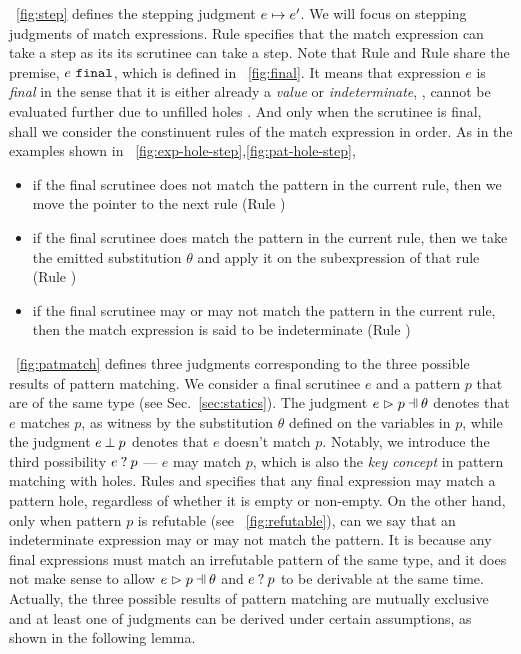 \documentclass[runningheads,envcountsame,a4paper]{llncs}
\begin{document}


\figurename~\ref{fig:step} defines the stepping judgment
$e \mapsto e'$. We will focus on stepping judgments of match expressions.
Rule \ITExpMatch specifies that the match expression can take a step as its its
scrutinee can take a step. Note that Rule \ITFailMatch and Rule \ITSuccMatch
share the premise, $e ~\mathtt{final}$, which is defined in \figurename~\ref{fig:final}. It
means that expression $e$ is \textit{final} in the sense that it is either already a
\textit{value} or \textit{indeterminate}, \ie, cannot be evaluated further due to unfilled holes
\cite{DBLP:journals/pacmpl/OmarVCH19}. And only when the scrutinee is final,
shall we consider the constinuent rules of the match expression in order. As in
the examples shown in \listfigurename~\ref{fig:exp-hole-step},\ref{fig:pat-hole-step},

\begin{itemize}
  \item
    if the final scrutinee does not match the pattern in the current rule,
    then we move the pointer to the next rule (Rule \ITFailMatch)

  \item
    if the final scrutinee does match the pattern in the current rule, 
    then we take the emitted substitution $\theta$ and apply it on the subexpression of that rule (Rule \ITSuccMatch)

  \item 
    if the final scrutinee may or may not match the pattern in the current rule,
    then the match expression is said to be indeterminate (Rule \IMatch)
\end{itemize}




\figurename~\ref{fig:patmatch} defines three judgments corresponding to the
three possible results of pattern matching. We consider a final scrutinee $e$
and a pattern $p$ that are of the same type (see Sec.~\ref{sec:statics}). The
judgment $\hpatmatch{e}{p}{\theta}$ denotes that $e$ matches $p$, as witness by
the substitution $\theta$ defined on the variables in $p$, while the judgment
$e \mathbin{\bot} p$ denotes that $e$ doesn't match $p$. Notably, we introduce the
third possibility $e \mathbin{?} p$ --- $e$ may match $p$, which is also the
\textit{key concept} in pattern matching with holes. Rules \MMEHole and \MMHole
specifies that any final expression may match a pattern hole, regardless of
whether it is empty or non-empty. On the other hand, only when pattern $p$ is
refutable (see \figurename~\ref{fig:refutable}), can we say that an indeterminate
expression may or may not match the pattern. It is because any final expressions
must match an irrefutable pattern of the same type, and it does not make sense to allow
$\hpatmatch{e}{p}{\theta}$ and $e \mathbin{?} p$ to be derivable at the same time. Actually,
the three possible results of pattern matching are mutually exclusive and at
least one of judgments can be derived under certain assumptions, as shown in the
following lemma.
\end{document}
